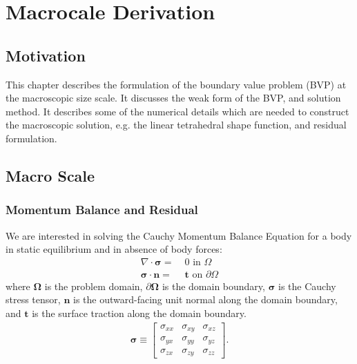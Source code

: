 \chapter{Macrocale Derivation}

\section{Motivation}

This chapter describes the formulation of the boundary value problem (BVP) at the macroscopic size scale. It discusses the weak form of the BVP, and solution method. It describes some of the numerical details which are needed to construct the macroscopic solution, e.g. the linear tetrahedral shape function, and residual formulation.

\section{Macro Scale}

\subsection{Momentum Balance and Residual}

We are interested in solving the Cauchy Momentum Balance Equation for a body in static equilibrium and in absence of body forces:
%
\begin{align}
\nabla \cdot \pmb{\sigma} =& \; 0 \text{ in } \Omega \label{momentum_balance} \\
\pmb{\sigma} \cdot \pmb{n} =& \; \pmb{t} \text{ on } \partial \Omega \nonumber
\end{align}
%
where $\pmb{\Omega}$ is the problem domain, $\partial \pmb{\Omega}$ is the domain boundary, $\pmb{\sigma}$ is the Cauchy stress tensor, $\pmb{n}$ is the outward-facing unit normal along the domain boundary, and $\pmb{t}$ is the surface traction along the domain boundary.
%
\begin{eqnarray}
\pmb{\sigma} \equiv
\begin{bmatrix}
\sigma_{xx} & \sigma_{xy} & \sigma_{xz} \\
\sigma_{yx} & \sigma_{yy} & \sigma_{yz} \\
\sigma_{zx} & \sigma_{zy} & \sigma_{zz} 
\end{bmatrix} .
\label{cauchy_stress_tensor}
\end{eqnarray}
%

